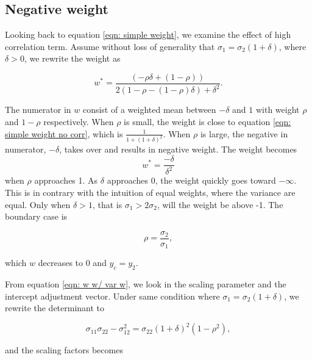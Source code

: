 \documentclass[11pt]{article}
\begin{document}
\subsection{Negative weight}\label{negative-weight}

Looking back to equation \ref{eqn: simple weight}, we examine the effect
of high correlation term. Assume without loss of generality that
\(\sigma_1 =\sigma_2 (1 + \delta)\), where \(\delta>0\), we rewrite the
weight as

\begin{equation}
\label{eqn: w high corr}
w^* = \frac{(-\rho\delta+ (1-\rho))}{2(1-\rho - (1-\rho)\delta)+\delta^2}.
\end{equation}

The numerator in \(w\) consist of a weighted
mean between $-\delta$ and $1$ with weight \(\rho\) and $1-\rho$ respectively. When \(\rho\)
is small, the weight is close to equation
\ref{eqn: simple weight no corr}, which is $\frac{1}{1+(1+\delta)^2}$. When \(\rho\) is large, the negative in numerator, \(-\delta\), takes over and results in negative
weight. The weight becomes 
\begin{equation}
\label{eqn: w simple rho 1}
w^* = \frac{-\delta}{\delta^2}
\end{equation}
when $\rho$ approaches 1. As $\delta$ approaches 0, the weight quickly goes toward $-\infty$. This is in contrary with the intuition of equal weights, where the variance are equal.
Only when $\delta >1$, that is $\sigma_1 > 2\sigma_2$, will the weight be above -1.
The boundary case is

\begin{equation}
\label{eqn: corr boundary}
\rho = \frac{\sigma_2}{\sigma_1},
\end{equation}

which \(w\) decreases to \(0\) and \(y_c = y_2\).

From equation \ref{eqn: w w/ var w}, we look in the scaling parameter
and the intercept adjustment vector. Under same condition where
\(\sigma_1 =\sigma_2 (1 + \delta)\), we rewrite the determinant to

\begin{equation}
\sigma_{11}\sigma_{22} - \sigma_{12}^2 = \sigma_{22} (1+\delta)^2 (1- \rho^2),
\end{equation}

and the scaling factors becomes
\end{document}
